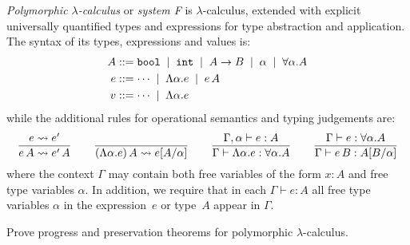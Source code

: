 \documentclass[arhiv]{izpit}
\begin{document}
\nadaljevanje


\naloga[\tocke{20}]

\emph{Polymorphic $\lambda$-calculus} or \emph{system F} is $\lambda$-calculus, extended with explicit universally quantified types and expressions for type abstraction and application. The syntax of its types, expressions and values is:
\begin{align*}
  A &\mathrel{{:}{:}{=}}
  \mathtt{bool} \;\mid\;
  \mathtt{int} \;\mid\;
  A \to B \;\mid\;
  \alpha \;\mid\;
  \forall \alpha. A \\
  e &\mathrel{{:}{:}{=}}
  \cdots \;\mid\;
  \Lambda \alpha. e \;\mid\;
  e \, A \\
  v &\mathrel{{:}{:}{=}}
  \cdots \;\mid\;
  \Lambda \alpha. e
\end{align*}
while the additional rules for operational semantics and typing judgements are:
\[
\frac{
  e \leadsto e'
}{
  e \, A \leadsto e' \, A
}
\qquad
\frac{
  \hbox{}
}{
  (\Lambda \alpha. e)\,A \leadsto e[A / \alpha]
}
\qquad
\frac{
  \Gamma, \alpha \vdash e : A
}{
  \Gamma \vdash \Lambda \alpha. e : \forall \alpha. A
}
\qquad
\frac{
  \Gamma \vdash e : \forall \alpha. A
}{
  \Gamma \vdash e \, B : A[B / \alpha]
}
\]
where the context $\Gamma$ may contain both free variables of the form $x : A$ and free type variables $\alpha$. In addition, we require that in each $\Gamma \vdash e : A$ all free type variables $\alpha$ in the expression~$e$ or type~$A$ appear in $\Gamma$.

Prove progress and preservation theorems for polymorphic $\lambda$-calculus.

\nadaljevanje

\end{document}
